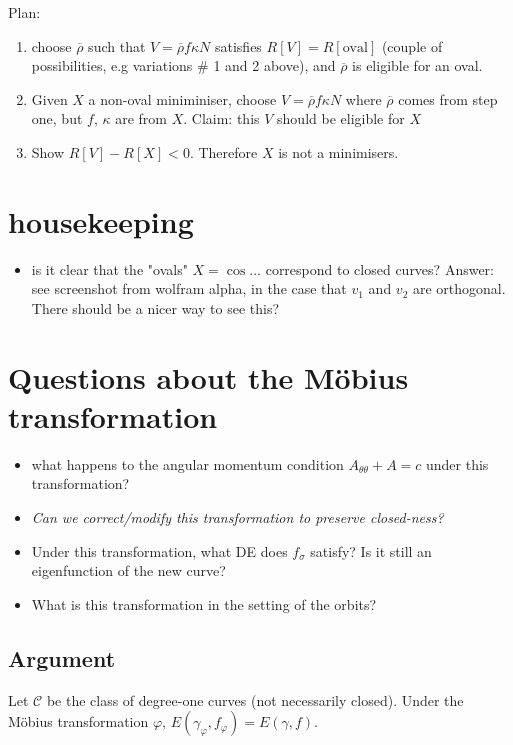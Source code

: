 \documentclass[12pt, a4paper]{amsart}
\theoremstyle{remark}
\begin{document}
Plan:
\begin{enumerate}
\item choose $\overline\rho$ such that  $V=\overline \rho f\kappa N $ 
  satisfies  $R[V]=R[\text{oval}]$ (couple of possibilities, e.g variations $\#$ 1 and 2 above), and $\overline \rho$ is eligible for an oval.
 \item   Given $X$ a non-oval miniminiser,  choose $V=\overline \rho f\kappa N $ where $\overline \rho $ comes from step one, but $f$, $\kappa$ are from $X$.
 Claim:  this $V$ should be eligible for $X$
 \item Show $R[V]-R[X]<0$.  Therefore $X$ is not a minimisers.
 \end{enumerate}



\section*{housekeeping}

\begin{itemize}
\item is it clear that the "ovals" $X=\cos \dots$ correspond to closed curves?  Answer:  see screenshot from wolfram alpha, in the case that $v_1$ and $v_2$ are orthogonal.      There should be a nicer way to see this?
\end{itemize}

\section*{Questions about the M\"obius transformation}

\begin{itemize}
\item what happens to the angular momentum condition $A_{\theta\theta} + A=c$  under this transformation?
\item \emph{Can we correct/modify this transformation to preserve closed-ness?}
\item Under this transformation, what DE does $f_\sigma$ satisfy?   Is it still an eigenfunction of the new curve?
\item What is this transformation in the setting of the orbits?
\end{itemize}

\subsection*{Argument}    Let $\mathcal{C}$ be the class of degree-one curves (not necessarily closed).   Under the M\"obius transformation $\varphi$, $E(\gamma_\varphi, f_\varphi)=E(\gamma,f)$.   
\end{document}
